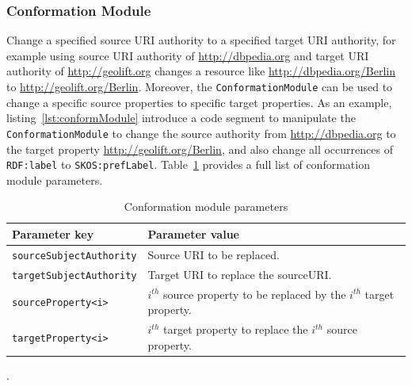 \documentclass[a4paper,twoside,bibtotoc,abstracton,12pt,BCOR=15mm]{article}
\begin{document}
\subsubsection{Conformation Module}
    Change a specified source URI authority to a specified target URI authority, 
    for example using source URI authority of \url{http://dbpedia.org} and target URI authority of \url{http://geolift.org} changes a resource like \url{http://dbpedia.org/Berlin} to \url{http://geolift.org/Berlin}.
    Moreover, the \texttt{ConformationModule} can be used to change a specific source properties to specific target properties.
    As an example, listing~\ref{lst:conformModule} introduce a code segment to manipulate the \texttt{ConformationModule} to change the source authority from \url{http://dbpedia.org} to the target property \url{http://geolift.org/Berlin}, and also change all occurrences of \texttt{RDF:label} to \texttt{SKOS:prefLabel}.
    Table~\ref{tbl:conformPram} provides a full list of conformation module parameters.
    

    \begin{table}
    \caption{Conformation module parameters} \label{tbl:conformPram}
    \small
    \begin{tabularx}{\textwidth}{@{}lX@{}}
    \toprule
    \textbf{Parameter key} 	& \textbf{Parameter value} \\
    \toprule
    \texttt{sourceSubjectAuthority}	& Source URI to be replaced.\\
    \midrule
    \texttt{targetSubjectAuthority}	& Target URI to replace the sourceURI.\\
    \midrule
    \texttt{sourceProperty<i>}	& $i^{th}$ source property to be replaced by the $i^{th}$ target property.\\
    \midrule
    \texttt{targetProperty<i>}	& $i^{th}$ target property to replace the $i^{th}$ source property.\\
    \bottomrule
    \end{tabularx}
    \end{table}.
    
\end{document}
